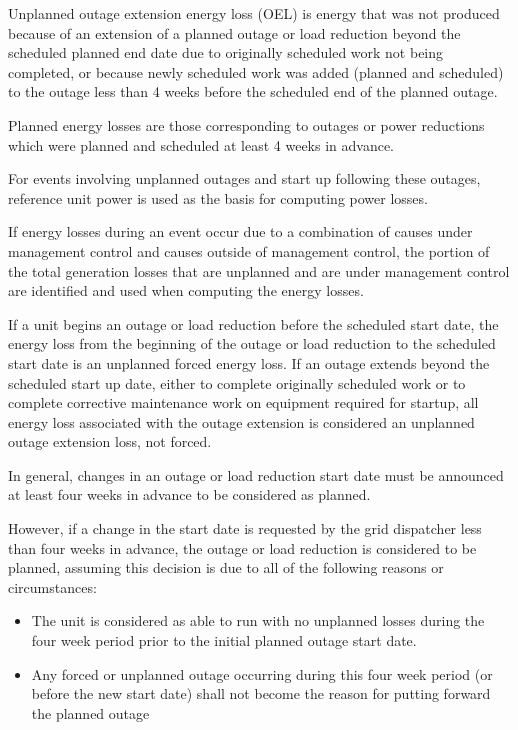 Unplanned outage extension energy loss (OEL) is energy that was not
produced because of an extension of a planned outage or load reduction
beyond the scheduled planned end date due to originally scheduled work
not being completed, or because newly scheduled work was added
(planned and scheduled) to the outage less than 4 weeks before the
scheduled end of the planned outage.

Planned energy losses are those corresponding to outages or power
reductions which were planned and scheduled at least 4 weeks in
advance.

For events involving unplanned outages and start up following these
outages, reference unit power is used as the basis for computing power
losses.

If energy losses during an event occur due to a combination of causes
under management control and causes outside of management control, the
portion of the total generation losses that are unplanned and are
under management control are identified and used when computing the
energy losses.

If a unit begins an outage or load reduction before the scheduled start date, the energy loss from the beginning of the outage or load reduction to the scheduled start date is an unplanned forced energy loss.
If an outage extends beyond the scheduled start up date, either to
complete originally scheduled work or to complete corrective
maintenance work on equipment required for startup, all energy loss
associated with the outage extension is considered an unplanned outage
extension loss, not forced.

In general, changes in an outage or load reduction start date must be
announced at least four weeks in advance to be considered as planned.

However, if a change in the start date is requested by the grid
dispatcher less than four weeks in advance, the outage or load
reduction is considered to be planned, assuming this decision is due
to all of the following reasons or circumstances:
\begin{itemize}
\item The unit is considered as able to run with no unplanned losses during the four week period prior to the initial planned outage start date.
\item Any forced or unplanned outage occurring during this four week
  period (or before the new start date) shall not become the reason
  for putting forward the planned outage
\end{itemize}

